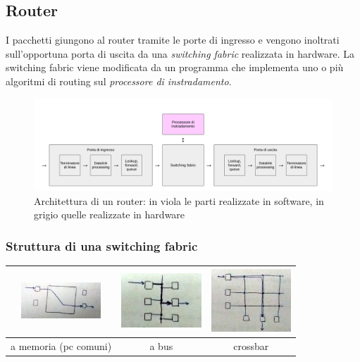 \documentclass[12pt,a4paper]{article}
\begin{document}
\subsection{Router}
I pacchetti giungono al router tramite le porte di ingresso e vengono
inoltrati sull'opportuna porta di uscita da una \emph{switching fabric}
realizzata in hardware. La switching fabric viene modificata da un
programma che implementa uno o più algoritmi di routing sul
\emph{processore di instradamento}.

\begin{figure}[H]
\centering
\includegraphics[width=18cm]{img/3/Router.pdf}
\caption{Architettura di un router: in viola le parti realizzate in software, in grigio quelle realizzate in hardware}
\end{figure}

\subsubsection{Struttura di una switching fabric}
\begin{table}[H]
\centering
\begin{tabular}{| c | c | c |}\hline
  \includegraphics[width=3cm]{img/3/sf-memoria.png}  & \includegraphics[width=3cm]{img/3/sf-bus.png} & \includegraphics[width=3cm]{img/3/sf-crossbar.png} \\ \hline
  a memoria (pc comuni) & a bus & crossbar \\ \hline
\end{tabular}
\end{table}
\end{document}
